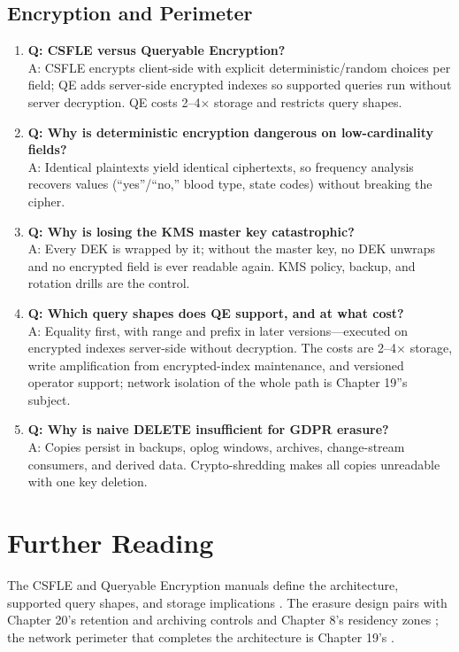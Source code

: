 \subsection{Encryption and Perimeter}
\begin{enumerate}
    \item \textbf{Q: CSFLE versus Queryable Encryption?}\\
    A: CSFLE encrypts client-side with explicit deterministic/random choices per field; QE adds server-side encrypted indexes so supported queries run without server decryption. QE costs 2--4$\times$ storage and restricts query shapes.

    \item \textbf{Q: Why is deterministic encryption dangerous on low-cardinality fields?}\\
    A: Identical plaintexts yield identical ciphertexts, so frequency analysis recovers values (``yes''/``no,'' blood type, state codes) without breaking the cipher.

    \item \textbf{Q: Why is losing the KMS master key catastrophic?}\\
    A: Every DEK is wrapped by it; without the master key, no DEK unwraps and no encrypted field is ever readable again. KMS policy, backup, and rotation drills are the control.

    \item \textbf{Q: Which query shapes does QE support, and at what cost?}\\
    A: Equality first, with range and prefix in later versions---executed on encrypted indexes server-side without decryption. The costs are 2--4$\times$ storage, write amplification from encrypted-index maintenance, and versioned operator support; network isolation of the whole path is Chapter 19''s subject.

    \item \textbf{Q: Why is naive DELETE insufficient for GDPR erasure?}\\
    A: Copies persist in backups, oplog windows, archives, change-stream consumers, and derived data. Crypto-shredding makes all copies unreadable with one key deletion.
\end{enumerate}

\section{Further Reading}
The CSFLE and Queryable Encryption manuals define the architecture, supported query shapes, and storage implications \cite{mongodbCSFLEDocs,mongodbQueryableEncryptionDocs}. The erasure design pairs with Chapter 20's retention and archiving controls \cite{mongodbOnlineArchiveDocs} and Chapter 8's residency zones \cite{mongodbZoneShardingDocs}; the network perimeter that completes the architecture is Chapter 19's \cite{mongodbPrivateLinkDocs,mongodbTLSDocs}.

